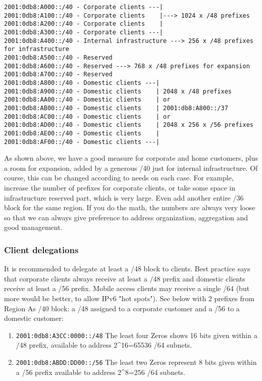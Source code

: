 \documentclass[
]{article}
\providecommand{\tightlist}{%
  \setlength{\itemsep}{0pt}\setlength{\parskip}{0pt}}
\begin{document}
\begin{verbatim}
2001:0db8:A000::/40 - Corporate clients ---|
2001:0db8:A100::/40 - Corporate clients    |---> 1024 x /48 prefixes
2001:0db8:A200::/40 - Corporate clients    |
2001:0db8:A300::/40 - Corporate clients ---|
2001:0db8:A400::/40 - Internal infrastructure ---> 256 x /48 prefixes for infrastructure
2001:0db8:A500::/40 - Reserved
2001:0db8:A600::/40 - Reserved ---> 768 x /48 prefixes for expansion
2001:0db8:A700::/40 - Reserved
2001:0db8:A800::/40 - Domestic clients ---|
2001:0db8:A900::/40 - Domestic clients    | 2048 x /48 prefixes
2001:0db8:AA00::/40 - Domestic clients    | or
2001:0db8:AB00::/40 - Domestic clients    | 2001:db8:A800::/37
2001:0db8:AC00::/40 - Domestic clients    | or 
2001:0db8:AD00::/40 - Domestic clients    | 2048 x 256 x /56 prefixes
2001:0db8:AE00::/40 - Domestic clients    |
2001:0db8:AF00::/40 - Domestic clients ---|
\end{verbatim}

As shown above, we have a good measure for corporate and home customers,
plus a room for expansion, added by a generous /40 just for internal
infrastructure. Of course, this can be changed according to needs on
each case. For example, increase the number of prefixes for corporate
clients, or take some space in infrastructure reserved part, which is
very large. Even add another entire /36 block for the same region. If
you do the math, the numbers are always very loose so that we can always
give preference to address organization, aggregation and good
management.

\subsubsection{Client delegations}\label{client-delegations}

It is recommended to delegate at least a /48 block to clients. Best
practice says that corporate clients always receive at least a /48
prefix and domestic clients receive at least a /56 prefix. Mobile access
clients may receive a single /64 (but more would be better, to allow
IPv6 "hot spots"). See below with 2 prefixes from Region
A\textquotesingle s /40 block: a /48 assigned to a corporate customer
and a /56 to a domestic customer:

\begin{enumerate}
\def\labelenumi{\arabic{enumi}.}
\tightlist
\item
  \texttt{2001:0db8:A3CC:0000::/48} The least four Zeros shows 16 bits
  given within a /48 prefix, available to address 2\^{}16=65536 /64
  subnets.
\item
  \texttt{2001:0db8:ABDD:DD00::/56} The least two Zeros represent 8 bits
  given within a /56 prefix available to address 2\^{}8=256 /64 subnets.
\end{enumerate}
\end{document}

